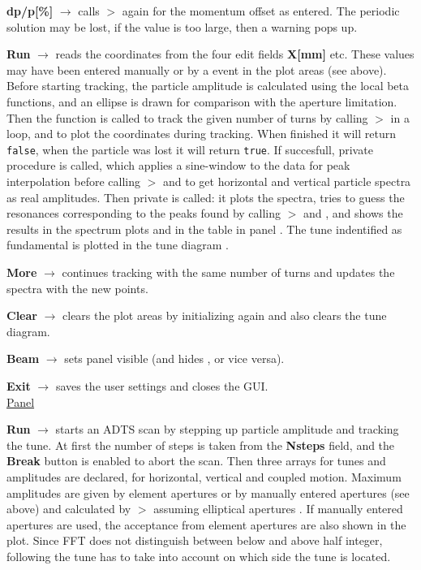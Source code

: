 \documentclass[12pt]{article}
\newcommand\code[1]{{\tt #1}}
\newcommand{\ofld}[1]{\colorbox{black!15}{{{\color{black}\bf #1}}}}
\newcommand\guico[1]{{\color{blue}\code{#1}}}
\newcommand\guifco[1]{{\color{violet}\code{#1}}}
\newcommand{\unico}[1]{{\color{burntorange}\code{#1}}}
\newcommand{\evcod}[2]{\ofld{#1} $\rightarrow$ \guico{#2}}
\newcommand{\prcod}[2]{\opauni{#1}$>$\unico{#2}}
\newcommand{\opagui}[1]{\colorbox{blue!20}{{\color{black}\code{#1}}}}
\newcommand{\ogui}[1]{\hyperref[#1]{\opagui{#1}}}
\newcommand{\opaguif}[1]{\colorbox{violet!30}{{\color{black}\code{#1}}}}
\newcommand{\oguif}[1]{\hyperref[#1]{\opaguif{#1}}}
\newcommand{\opauni}[1]{\colorbox{orange!30}{{\color{black}\code{#1}}}}
\begin{document}
\evcod{dp/p[\%]}{ediAction[edidpp]} calls \prcod{tracklib}{Initdpp} again for the momentum offset as entered. The periodic solution may be lost, if the value is too large, then a warning pops up. 

\evcod{Run}{butRunClick} reads the coordinates from the four edit fields \ofld{X[mm]} etc. These values may have been entered manually or by a \guifco{pMouseDown} event in the \guico{psx,psy} plot areas (see \oguif{comfigureframe} above). Before starting tracking, the particle amplitude is calculated using the local beta functions, and an ellipse is drawn for comparison with the aperture limitation. Then the function \guico{Track} is called to track the given number of turns by calling 
\prcod{tracklib}{Oneturn} in a loop, and to plot the coordinates during tracking. When finished it will return \code{false}, when the particle was lost it will return \code{true}. If succesfull, private procedure \guico{Spectrum} is called, which applies a sine-window to the data for peak interpolation before calling \prcod{tracklib}{TWOFFT} and \unico{FFTtoAmp} to get horizontal and vertical particle spectra as real amplitudes. Then private \guico{FFTplot} is called: it plots the spectra, tries to guess the resonances corresponding to the peaks found by calling \prcod{tracklib}{FindPeaks} and \unico{ResoGuess}, and shows the results in the spectrum plots and in the table \guico{resgrid} in panel \guico{PanRes}. The tune indentified as fundamental is plotted in the tune diagram \ogui{opatunediag}.

\evcod{More}{butMoreClick} continues tracking with the same number of turns and updates the spectra with the new points.

\evcod{Clear}{butClearClick} clears the plot areas by initializing again and also clears the tune diagram.

\evcod{Beam}{butBeamClick} sets panel \guico{PanBeam} visible (and hides \guico{PanTush}, or vice versa).

\evcod{Exit}{butExitClick} saves the user settings and closes the GUI.\\[1ex]

\underline{Panel \guico{PanTush}}

\evcod{Run}{butTushClick} starts an ADTS scan by stepping up particle amplitude and tracking the tune. At first the number of steps is taken from the \ofld{Nsteps} field, and the \ofld{Break} button is enabled to abort the scan. Then three arrays for tunes and amplitudes are declared, for horizontal, vertical and coupled motion. Maximum amplitudes are given by element apertures or by manually entered apertures (see above) and calculated by \prcod{tracklib}{AmpKappa} assuming elliptical apertures \cite{inside}.  If manually entered apertures are used, the acceptance from element apertures are also shown in the plot. Since FFT does not distinguish between below and above half integer, following the tune has to take into account on which side the tune is located.
\end{document}
